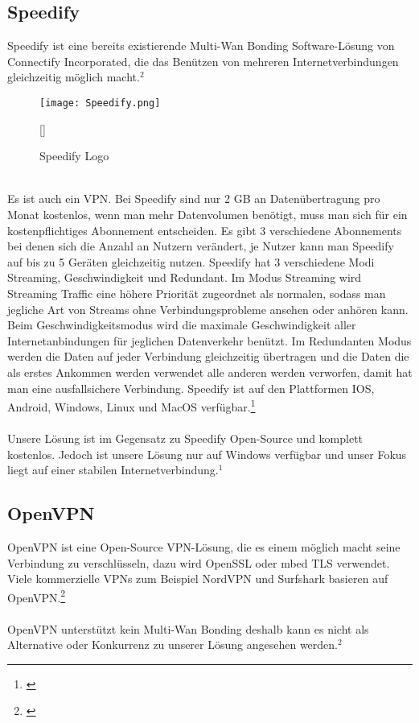 \subsection{Speedify}
Speedify ist eine bereits existierende Multi-Wan Bonding Software-Lösung von Connectify Incorporated, die das Benützen von mehreren Internetverbindungen gleichzeitig möglich macht.$^{2}$
\begin{figure}[H]
    \centering
    \texttt{[image: Speedify.png]}
    \caption[Speedify Logo]{Speedify Logo}[\cite{3}] 
\end{figure}
\newpage
\ \\
Es ist auch ein VPN. Bei Speedify sind nur 2 GB an Datenübertragung pro Monat kostenlos, wenn man mehr Datenvolumen benötigt, muss man sich für ein kostenpflichtiges Abonnement entscheiden. Es gibt 3 verschiedene Abonnements bei denen sich die Anzahl an Nutzern verändert, je Nutzer kann man Speedify auf bis zu 5 Geräten gleichzeitig nutzen. Speedify hat 3 verschiedene Modi Streaming, Geschwindigkeit und Redundant. Im Modus Streaming wird Streaming Traffic eine höhere Priorität zugeordnet als normalen, sodass man jegliche Art von Streams ohne Verbindungsprobleme ansehen oder anhören kann. Beim Geschwindigkeitsmodus wird die maximale Geschwindigkeit aller Internetanbindungen für jeglichen Datenverkehr benützt. Im Redundanten Modus werden die Daten auf jeder Verbindung gleichzeitig übertragen und die Daten die als erstes Ankommen werden verwendet alle anderen werden verworfen, damit hat man eine ausfallsichere Verbindung. Speedify ist auf den Plattformen IOS, Android, Windows, Linux und MacOS verfügbar.\footnote[1]{\cite[Vgl.][]{3}}
\\\\
Unsere Lösung ist im Gegensatz zu Speedify Open-Source und komplett kostenlos. Jedoch ist unsere Lösung nur auf Windows verfügbar und unser Fokus liegt auf einer stabilen Internetverbindung.$^{1}$

\subsection{OpenVPN}
OpenVPN ist eine Open-Source VPN-Lösung, die es einem möglich macht seine Verbindung zu verschlüsseln, dazu wird OpenSSL oder mbed TLS verwendet. Viele kommerzielle VPNs zum Beispiel NordVPN und Surfshark basieren auf OpenVPN.\footnote[2]{\cite[Vgl.][]{4}}
\\\\
OpenVPN unterstützt kein Multi-Wan Bonding deshalb kann es nicht als Alternative oder Konkurrenz zu unserer Lösung angesehen werden.$^{2}$

